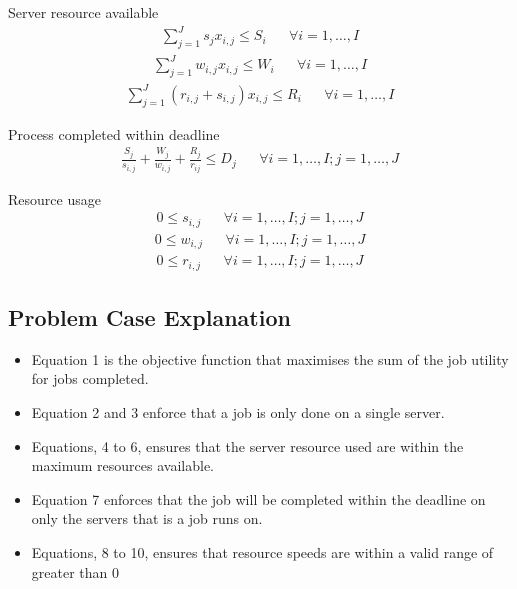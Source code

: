 Server resource available
\begin{align}
    \sum_{j=1}^J s_j x_{i,j} \leq S_i && \forall i = 1,\dots,I
\end{align}
\begin{align}
    \sum_{j=1}^J w_{i,j} x_{i,j} \leq W_i && \forall i = 1,\dots,I
\end{align}
\begin{align}
    \sum_{j=1}^J (r_{i,j} + s_{i,j}) x_{i,j} \leq R_i && \forall i = 1,\dots,I
\end{align}

Process completed within deadline
\begin{align}
    \frac{S_j}{s_{i,j}} + \frac{W_j}{w_{i,j}} + \frac{R_j}{r_{ij}} \leq D_j && \forall i = 1,\dots,I; j = 1,\dots,J
\end{align}

Resource usage
\begin{align}
    0 \le s_{i,j} && \forall i = 1,\dots,I; j = 1,\dots,J
\end{align}
\begin{align}
    0 \le w_{i,j} && \forall i = 1,\dots,I; j = 1,\dots,J
\end{align}
\begin{align}
    0 \le r_{i,j} && \forall i = 1,\dots,I; j = 1,\dots,J
\end{align}

\subsection{Problem Case Explanation}\label{subsec:problem-case-explanation}
\begin{itemize}
    \item Equation 1 is the objective function that maximises the sum of the job utility for jobs completed.
    \item Equation 2 and 3 enforce that a job is only done on a single server.
    \item Equations, 4 to 6, ensures that the server resource used are within the maximum resources available.
    \item Equation 7 enforces that the job will be completed within the deadline on only the servers that is a job runs on.
    \item Equations, 8 to 10, ensures that resource speeds are within a valid range of greater than 0
\end{itemize}


